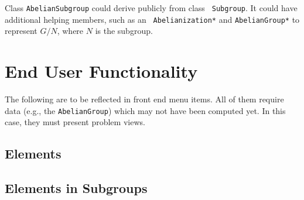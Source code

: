 Class {\tt AbelianSubgroup} could derive publicly from class {\tt
Subgroup}. It could have additional helping members, such as an {\tt
Abelianization*} and {\tt AbelianGroup*} to represent $G/N$, where $N$
is the subgroup.



\section{End User Functionality}

The following are to be reflected in front end menu items. All of them
require data (e.g., the {\tt AbelianGroup}) which may not have been
computed yet. In this case, they must present problem views.


\subsection{Elements}

\begin{enumerate}







\end{enumerate}


\subsection{Elements in Subgroups}

